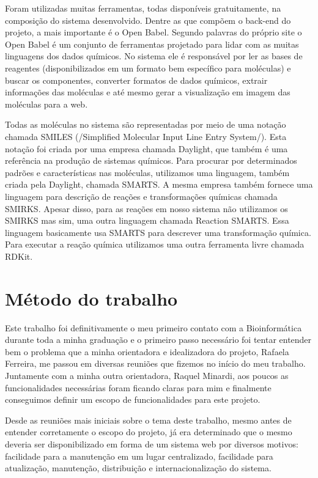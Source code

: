 \documentclass{abnt}
\begin{document}
Foram utilizadas muitas ferramentas, todas disponíveis gratuitamente, na composição
do sistema desenvolvido. Dentre as que compõem o back-end do projeto, a mais importante
é o Open Babel. Segundo palavras do próprio site o Open Babel é um conjunto de ferramentas
projetado para lidar com as muitas linguagens dos dados químicos. No sistema ele
é responsável por ler as bases de reagentes (disponibilizados em um formato bem
específico para moléculas) e buscar os componentes, converter formatos de dados
químicos, extrair informações das moléculas e até mesmo gerar a visualização em
imagem das moléculas para a web.

Todas as moléculas no sistema são representadas por meio de uma notação chamada
SMILES (/Simplified Molecular Input Line Entry System/). Esta notação foi criada
por uma empresa chamada Daylight, que também é uma referência na produção de sistemas
químicos. Para procurar por determinados padrões e características nas moléculas,
utilizamos uma linguagem, também criada pela Daylight, chamada SMARTS. A mesma empresa
também fornece uma linguagem para descrição de reações e transformações químicas
chamada SMIRKS. Apesar disso, para as reações em nosso sistema não utilizamos os
SMIRKS mas sim, uma outra linguagem chamada Reaction SMARTS. Essa linguagem basicamente
usa SMARTS para descrever uma transformação química. Para executar a reação química
utilizamos uma outra ferramenta livre chamada RDKit.

\chapter{Método do trabalho}

Este trabalho foi definitivamente o meu primeiro contato com a Bioinformática durante
toda a minha graduação e o primeiro passo necessário foi tentar entender bem o problema
que a minha orientadora e idealizadora do projeto, Rafaela Ferreira, me passou em
diversas reuniões que fizemos no início do meu trabalho. Juntamente com a minha
outra orientadora, Raquel Minardi, aos poucos as funcionalidades necessárias foram
ficando claras para mim e finalmente conseguimos definir um escopo de funcionalidades
para este projeto.

Desde as reuniões mais iniciais sobre o tema deste trabalho, mesmo antes de entender
corretamente o escopo do projeto, já era determinado que o mesmo deveria ser disponibilizado
em forma de um sistema web por diversos motivos: facilidade para a manutenção em
um lugar centralizado, facilidade para atualização, manutenção, distribuição e internacionalização
do sistema.
\end{document}
